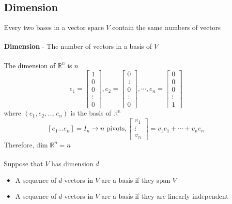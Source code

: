 \begin{enumerate}
\subsection{Dimension}
Every two bases in a vector space $V$ contain the same numbers of vectors \\\\
\textbf{Dimension} - The number of vectors in a basis of $V$ \\\\
The dimension of $\mathbb{R}^n$ is $n$ 
\[
  e_1 = \begin{bmatrix} 1 \\ 0 \\ 0 \\ \vdots \\ 0 \end{bmatrix}, 
  e_2 = \begin{bmatrix} 0 \\ 1 \\ 0 \\ \vdots \\ 0 \end{bmatrix},
  \cdots, 
  e_n = \begin{bmatrix} 0 \\ 0 \\ 0 \\ \vdots \\ 1 \end{bmatrix}
\] where $(e_1, e_2, \dots, e_n)$ is the basis of $\mathbb{R}^n$
\[
  [e_1 \dots e_n] = I_n \rightarrow n \text{ pivots}, 
  \begin{bmatrix} v_1 \\ \vdots \\ v_n \end{bmatrix} = 
  v_1e_1 + \cdots + v_ne_n
\] Therefore, dim $\mathbb{R}^n = n$ \\\\
Suppose that $V$ has dimension $d$ 
\begin{itemize}
  \item A sequence of $d$ vectors in $V$ are a basis if they span $V$ 
  \item A sequence of $d$ vectors in $V$ are a basis if they are linearly independent 
\end{itemize}

\end{enumerate}
